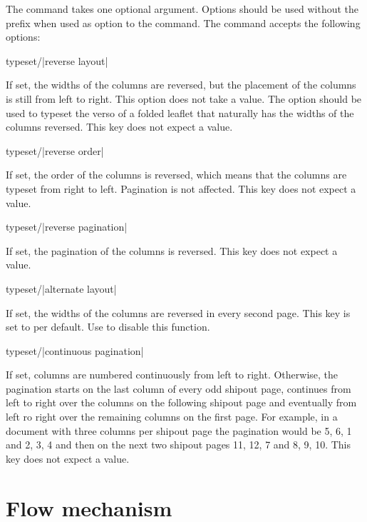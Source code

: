 \documentclass[a4paper]{article}
\begin{document}
The command takes one optional argument. Options should be used without the  prefix when used as option to the \macro{\leporellotypesetcolumns} command. The command accepts the following options:

\begin{macrodef}
typeset/|reverse layout|
\end{macrodef}
If set, the widths of the columns are reversed, but the placement of the columns is still from left to right. This option does not take a value. The option should be used to typeset the verso of a folded leaflet that naturally has the widths of the columns reversed. This key does not expect a value.

\begin{macrodef}
typeset/|reverse order|
\end{macrodef}
If set, the order of the columns is reversed, which means that the columns are typeset from right to left. Pagination is not affected. This key does not expect a value.

\begin{macrodef}
typeset/|reverse pagination|
\end{macrodef}
If set, the pagination of the columns is reversed. This key does not expect a value.

\begin{macrodef}
typeset/|alternate layout|
\end{macrodef}
If set, the widths of the columns are reversed in every second page. This key is set to  per default. Use  to disable this function.

\begin{macrodef}
typeset/|continuous pagination|
\end{macrodef}
If set, columns are numbered continuously from left to right. Otherwise, the pagination starts on the last column of every odd shipout page, continues from left to right over the columns on the following shipout page and eventually from left ro right over the remaining columns on the first page. For example, in a document with three columns per shipout page the pagination would be 5, 6, 1 and 2, 3, 4 and then on the next two shipout pages 11, 12, 7 and 8, 9, 10. This key does not expect a value.

\section{Flow mechanism}\label{sec:flow}
\end{document}
